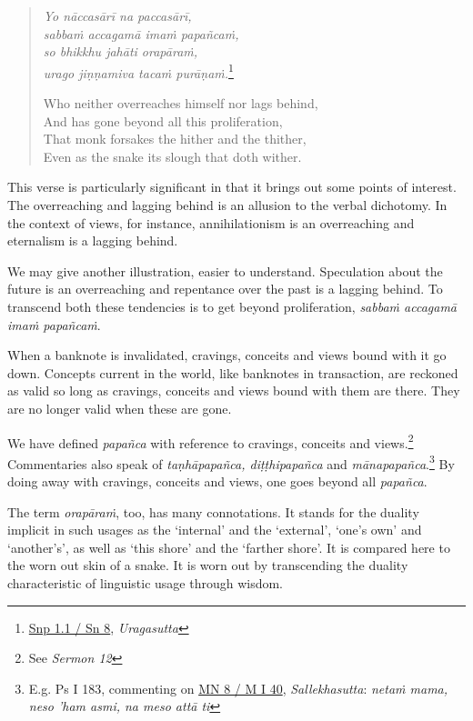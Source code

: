 \begin{quote}
\emph{Yo nāccasārī na paccasārī,}\\
\emph{sabbaṁ accagamā imaṁ papañcaṁ,}\\
\emph{so bhikkhu jahāti orapāraṁ,}\\
\emph{urago jiṇṇamiva tacaṁ purāṇaṁ.}\footnote{\href{https://suttacentral.net/snp1.1/pli/ms}{Snp 1.1 / Sn 8}, \emph{Uragasutta}}

Who neither overreaches himself nor lags behind,\\
And has gone beyond all this proliferation,\\
That monk forsakes the hither and the thither,\\
Even as the snake its slough that doth wither.
\end{quote}

This verse is particularly significant in that it brings out some points of interest. The overreaching and lagging behind is an allusion to the verbal dichotomy. In the context of views, for instance, annihilationism is an overreaching and eternalism is a lagging behind.

We may give another illustration, easier to understand. Speculation about the future is an overreaching and repentance over the past is a lagging behind. To transcend both these tendencies is to get beyond proliferation, \emph{sabbaṁ accagamā imaṁ papañcaṁ}.

When a banknote is invalidated, cravings, conceits and views bound with it go down. Concepts current in the world, like banknotes in transaction, are reckoned as valid so long as cravings, conceits and views bound with them are there. They are no longer valid when these are gone.

We have defined \emph{papañca} with reference to cravings, conceits and views.\footnote{See \emph{Sermon 12}} Commentaries also speak of \emph{taṇhāpapañca, diṭṭhipapañca} and \emph{mānapapañca}.\footnote{E.g. Ps I 183, commenting on \href{https://suttacentral.net/mn8/pli/ms}{MN 8 / M I 40}, \emph{Sallekhasutta}: \emph{netaṁ mama, neso 'ham asmi, na meso attā ti}} By doing away with cravings, conceits and views, one goes beyond all \emph{papañca}.

The term \emph{orapāraṁ}, too, has many connotations. It stands for the duality implicit in such usages as the `internal' and the `external', `one's own' and `another's', as well as `this shore' and the `farther shore'. It is compared here to the worn out skin of a snake. It is worn out by transcending the duality characteristic of linguistic usage through wisdom.

